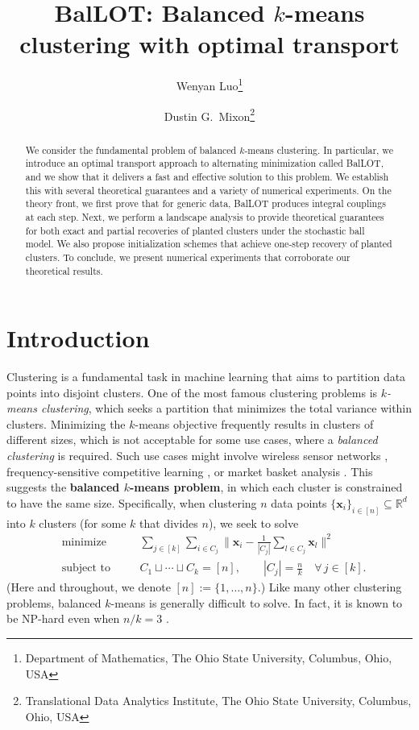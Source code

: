 \documentclass{article}
\title{BalLOT: Balanced $k$-means clustering with optimal transport}
\author{
Wenyan Luo\thanks{Department of Mathematics, The Ohio State University, Columbus, Ohio, USA}
\and
Dustin G.\ Mixon\footnotemark[1] \thanks{Translational Data Analytics Institute, The Ohio State University, Columbus, Ohio, USA}
}
\date{}
\theoremstyle{plain}
\theoremstyle{definition}
\newcommand{\1}{\mathbf{1}}
\begin{document}
\maketitle
\begin{abstract}
We consider the fundamental problem of balanced $k$-means clustering.
In particular, we introduce an optimal transport approach to alternating minimization called BalLOT, and we show that it delivers a fast and effective solution to this problem.
We establish this with several theoretical guarantees and a variety of numerical experiments.
On the theory front, we first prove that for generic data, BalLOT produces integral couplings at each step.
Next, we perform a landscape analysis to provide theoretical guarantees for both exact and partial recoveries of planted clusters under the stochastic ball model.
We also propose initialization schemes that achieve one-step recovery of planted clusters.
To conclude, we present numerical experiments that corroborate our theoretical results.
\end{abstract}

\section{Introduction}

Clustering is a fundamental task in machine learning that aims to partition data points into disjoint clusters.
One of the most famous clustering problems is \textit{$k$-means clustering}, which seeks a partition that minimizes the total variance within clusters.
Minimizing the $k$-means objective frequently results in clusters of different sizes, which is not acceptable for some use cases, where a \textit{balanced clustering} is required.
Such use cases might involve wireless sensor networks \cite{shu2005power}, frequency-sensitive competitive learning \cite{banerjee2004frequency}, or market basket analysis \cite{ghosh2005clustering}.
This suggests the \textbf{balanced $k$-means problem}, in which each cluster is constrained to have the same size.
Specifically, when clustering $n$ data points $\{\bm{x}_i\}_{i\in[n]}\subseteq\mathbb{R}^d$ into $k$ clusters (for some $k$ that divides $n$), we seek to solve
\begin{equation}
\label{problem: balanced kmeans}
\begin{aligned}
     & \text{minimize} && \quad \sum_{j\in [k]}\sum_{i\in C_j} \bigg\|\bm{x}_i - \frac{1}{|C_j|} \sum_{l \in C_j}\bm{x}_l \bigg\|^2 \\[5pt]
   & \text{subject to} &&  \quad C_1\sqcup \cdots\sqcup C_k = [n], \qquad |C_j| = \frac{n}{k} \quad \forall\, j\in [k].
\end{aligned}
\end{equation}
(Here and throughout, we denote $[n]:=\{1,\ldots,n\}$.)
Like many other clustering problems, balanced $k$-means is generally difficult to solve.
In fact, it is known to be \textsf{NP}-hard even when $n/k=3$ \cite{pyatkin2017nphardness}.
\end{document}
